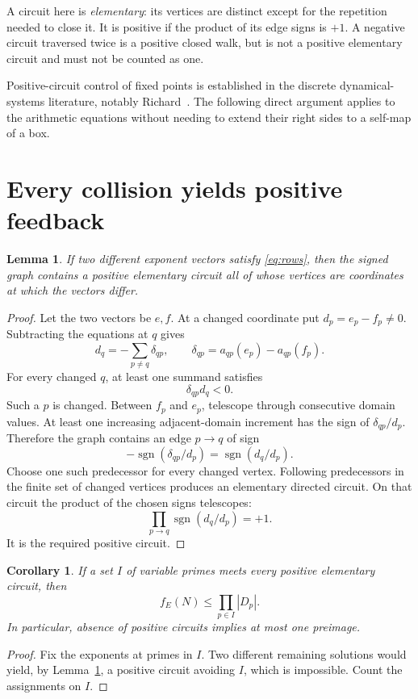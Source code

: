 \documentclass[11pt]{article}
\newtheorem{lemma}[theorem]{Lemma}
\newtheorem{corollary}[theorem]{Corollary}
\DeclareMathOperator{\sgn}{sgn}
\begin{document}
A circuit here is \emph{elementary}: its vertices are distinct except for the repetition needed to close it. It is positive if the product of its edge signs is $+1$. A negative circuit traversed twice is a positive closed walk, but is not a positive elementary circuit and must not be counted as one.

Positive-circuit control of fixed points is established in the discrete dynamical-systems literature, notably Richard~\cite{richard}. The following direct argument applies to the arithmetic equations without needing to extend their right sides to a self-map of a box.

\section{Every collision yields positive feedback}
\begin{lemma}\label{lem:positive}
If two different exponent vectors satisfy \eqref{eq:rows}, then the signed graph contains a positive elementary circuit all of whose vertices are coordinates at which the vectors differ.
\end{lemma}
\begin{proof}
Let the two vectors be $e,f$. At a changed coordinate put $d_p=e_p-f_p\ne0$. Subtracting the equations at $q$ gives
\[
 d_q=-\sum_{p\ne q}\delta_{qp},\qquad
 \delta_{qp}=a_{qp}(e_p)-a_{qp}(f_p).
\]
For every changed $q$, at least one summand satisfies
\[
 \delta_{qp}d_q<0.
\]
Such a $p$ is changed. Between $f_p$ and $e_p$, telescope through consecutive domain values. At least one increasing adjacent-domain increment has the sign of $\delta_{qp}/d_p$. Therefore the graph contains an edge $p\to q$ of sign
\[
 -\sgn(\delta_{qp}/d_p)=\sgn(d_q/d_p).
\]
Choose one such predecessor for every changed vertex. Following predecessors in the finite set of changed vertices produces an elementary directed circuit. On that circuit the product of the chosen signs telescopes:
\[
 \prod_{p\to q}\sgn(d_q/d_p)=+1.
\]
It is the required positive circuit.
\end{proof}

\begin{corollary}\label{cor:fvs}
If a set $I$ of variable primes meets every positive elementary circuit, then
\[
 \boxed{f_E(N)\le\prod_{p\in I}|D_p|.}
\]
In particular, absence of positive circuits implies at most one preimage.
\end{corollary}
\begin{proof}
Fix the exponents at primes in $I$. Two different remaining solutions would yield, by Lemma~\ref{lem:positive}, a positive circuit avoiding $I$, which is impossible. Count the assignments on $I$.
\end{proof}
\end{document}
